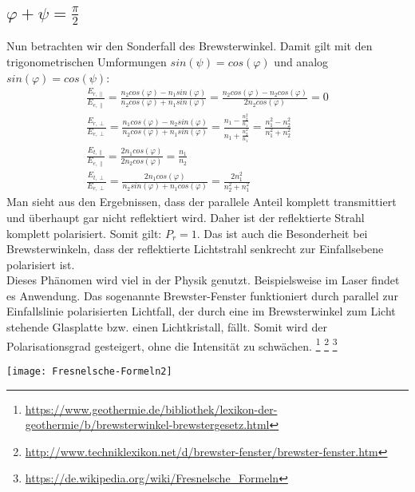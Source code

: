 \subsection*{$\varphi+\psi=\frac{\pi}{2}$}
Nun betrachten wir den Sonderfall des Brewsterwinkel. Damit gilt mit den trigonometrischen Umformungen $sin(\psi)=cos(\varphi)$ und analog $sin(\varphi)=cos(\psi)$:
\begin{gather*}
\frac{E_{r,\parallel}}{E_{e,\parallel}}=\frac{n_2cos(\varphi)-n_1sin(\varphi)}{n_2cos(\varphi)+n_1sin(\varphi)}= \frac{n_2cos(\varphi)-n_2cos(\varphi)}{2n_2cos(\varphi)}=0\\
\frac{E_{r,\perp}}{E_{e,\perp}}=\frac{n_1cos(\varphi)-n_2sin(\varphi)}{n_2cos(\varphi)+n_1sin(\varphi)}=\frac{n_1-\frac{n_2^2}{n_1}}{n_1+\frac{n_2^2}{n_1}}=\frac{n_1^2-n_2^2}{n_1^2+n_2^2}\\
\frac{E_{t,\parallel}}{E_{e,\parallel}}=\frac{2n_1cos(\varphi)}{2n_2cos(\varphi)}=\frac{n_1}{n_2}\\
\frac{E_{t,\perp}}{E_{e,\perp}}=\frac{2n_1cos(\varphi)}{n_2sin(\varphi)+n_1cos(\varphi)}=\frac{2n^2_1}{n_2^2+n_1^2}
\end{gather*}
Man sieht aus den Ergebnissen, dass der parallele Anteil komplett transmittiert und überhaupt gar nicht reflektiert wird. Daher ist der reflektierte Strahl komplett polarisiert. Somit gilt: $P_r=1$. Das ist auch die Besonderheit bei Brewsterwinkeln, dass der reflektierte Lichtstrahl senkrecht zur Einfallsebene polarisiert ist. \\
Dieses Phänomen wird viel in der Physik genutzt. Beispielsweise im Laser findet es Anwendung. Das sogenannte Brewster-Fenster funktioniert durch parallel zur Einfallslinie polarisierten Lichtfall, der durch eine im Brewsterwinkel zum Licht stehende Glasplatte bzw. einen Lichtkristall, fällt. Somit wird der Polarisationsgrad gesteigert, ohne die Intensität zu schwächen.  
\footnote{\url{https://www.geothermie.de/bibliothek/lexikon-der-geothermie/b/brewsterwinkel-brewstergesetz.html}}
\footnote{\url{http://www.techniklexikon.net/d/brewster-fenster/brewster-fenster.htm}}
\footnote{\url{https://de.wikipedia.org/wiki/Fresnelsche_Formeln}}
\begin{center}
    \texttt{[image: Fresnelsche-Formeln2]}
\end{center}

